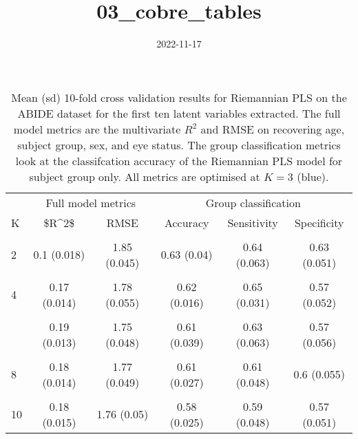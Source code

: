 \documentclass[
]{article}
\title{03\_cobre\_tables}
\author{}
\date{\vspace{-2.5em}2022-11-17}
\begin{document}
\maketitle

\begin{table}[htbp]

\caption{\label{tab:abide_cv_results}Mean (sd) 10-fold cross validation results for Riemannian PLS on the ABIDE dataset for the first ten latent variables extracted.  The full model metrics are the multivariate $R^2$ and RMSE on recovering age, subject group, sex, and eye status.  The group classification metrics look at the classifcation accuracy of the Riemannian PLS model for subject group only.  All metrics are optimised at $K = 3$ (blue).}
\centering
\begin{tabular}[t]{lc>{}c|ccc}
\toprule
\multicolumn{1}{c}{ } & \multicolumn{2}{c}{Full model metrics} & \multicolumn{3}{c}{Group classification} \\
\cmidrule(l{3pt}r{3pt}){2-3} \cmidrule(l{3pt}r{3pt}){4-6}
K & \$R\textasciicircum{}2\$ & RMSE & Accuracy & Sensitivity & Specificity\\
\midrule
\cellcolor{gray!6}{1} & \cellcolor{gray!6}{0.08 (0.014)} & \cellcolor{gray!6}{1.87 (0.046)} & \cellcolor{gray!6}{0.6 (0.029)} & \cellcolor{gray!6}{0.64 (0.071)} & \cellcolor{gray!6}{0.55 (0.049)}\\
2 & 0.1 (0.018) & 1.85 (0.045) & 0.63 (0.04) & 0.64 (0.063) & 0.63 (0.051)\\
\cellcolor{blue!20}{\cellcolor{gray!6}{3}} & \cellcolor{blue!20}{\cellcolor{gray!6}{0.15 (0.015)}} & \cellcolor{blue!20}{\cellcolor{gray!6}{1.8 (0.051)}} & \cellcolor{blue!20}{\cellcolor{gray!6}{0.58 (0.027)}} & \cellcolor{blue!20}{\cellcolor{gray!6}{0.61 (0.058)}} & \cellcolor{blue!20}{\cellcolor{gray!6}{0.53 (0.063)}}\\
4 & 0.17 (0.014) & 1.78 (0.055) & 0.62 (0.016) & 0.65 (0.031) & 0.57 (0.052)\\
\cellcolor{gray!6}{5} & \cellcolor{gray!6}{0.19 (0.013)} & \cellcolor{gray!6}{1.76 (0.05)} & \cellcolor{gray!6}{0.62 (0.028)} & \cellcolor{gray!6}{0.65 (0.049)} & \cellcolor{gray!6}{0.57 (0.065)}\\
\addlinespace
6 & 0.19 (0.013) & 1.75 (0.048) & 0.61 (0.039) & 0.63 (0.063) & 0.57 (0.056)\\
\cellcolor{gray!6}{7} & \cellcolor{gray!6}{0.19 (0.014)} & \cellcolor{gray!6}{1.76 (0.049)} & \cellcolor{gray!6}{0.59 (0.027)} & \cellcolor{gray!6}{0.62 (0.053)} & \cellcolor{gray!6}{0.54 (0.068)}\\
8 & 0.18 (0.014) & 1.77 (0.049) & 0.61 (0.027) & 0.61 (0.048) & 0.6 (0.055)\\
\cellcolor{gray!6}{9} & \cellcolor{gray!6}{0.18 (0.014)} & \cellcolor{gray!6}{1.76 (0.049)} & \cellcolor{gray!6}{0.59 (0.031)} & \cellcolor{gray!6}{0.59 (0.047)} & \cellcolor{gray!6}{0.59 (0.053)}\\
10 & 0.18 (0.015) & 1.76 (0.05) & 0.58 (0.025) & 0.59 (0.048) & 0.57 (0.051)\\
\bottomrule
\end{tabular}
\end{table}
\end{document}

